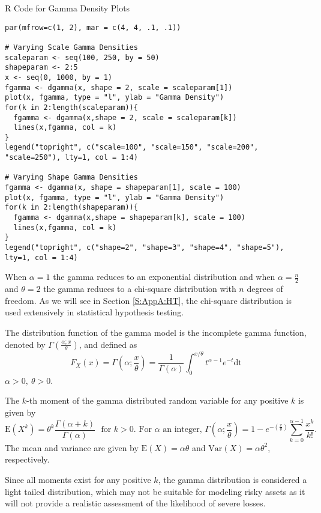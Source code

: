 \documentclass[]{book}
\theoremstyle{definition}
\theoremstyle{definition}
\theoremstyle{definition}
\theoremstyle{remark}
\begin{document}
R Code for Gamma Density Plots

\hypertarget{display.gammascale.2}{}
\begin{verbatim}
par(mfrow=c(1, 2), mar = c(4, 4, .1, .1))

# Varying Scale Gamma Densities
scaleparam <- seq(100, 250, by = 50)
shapeparam <- 2:5
x <- seq(0, 1000, by = 1)
fgamma <- dgamma(x, shape = 2, scale = scaleparam[1])
plot(x, fgamma, type = "l", ylab = "Gamma Density")
for(k in 2:length(scaleparam)){
  fgamma <- dgamma(x,shape = 2, scale = scaleparam[k])
  lines(x,fgamma, col = k)
}
legend("topright", c("scale=100", "scale=150", "scale=200", "scale=250"), lty=1, col = 1:4)

# Varying Shape Gamma Densities
fgamma <- dgamma(x, shape = shapeparam[1], scale = 100)
plot(x, fgamma, type = "l", ylab = "Gamma Density")
for(k in 2:length(shapeparam)){
  fgamma <- dgamma(x,shape = shapeparam[k], scale = 100)
  lines(x,fgamma, col = k)
}
legend("topright", c("shape=2", "shape=3", "shape=4", "shape=5"), lty=1, col = 1:4)
\end{verbatim}

When \(\alpha = 1\) the gamma reduces to an exponential distribution and
when \(\alpha = \frac{n}{2}\) and \(\theta = 2\) the gamma reduces to a
chi-square distribution with \(n\) degrees of freedom. As we will see in
Section \ref{S:AppA:HT}, the chi-square distribution is used extensively
in statistical hypothesis testing.

The distribution function of the gamma model is the incomplete gamma
function, denoted by \(\Gamma\left( \frac{\alpha;x}{\theta} \right)\),
and defined as
\[F_{X}\left( x \right) = \Gamma\left( \alpha; \frac{x}{\theta} \right) = \frac{1}{\Gamma\left( \alpha \right)}\int_{0}^{x /\theta}t^{\alpha - 1}e^{- t}\text{dt}\]
\(\alpha > 0,\ \theta > 0\).

The \(k\)-th moment of the gamma distributed random variable for any
positive \(k\) is given by
\[\mathrm{E}\left( X^{k} \right) = \theta^{k} \frac{\Gamma\left( \alpha + k \right)}{\Gamma\left( \alpha \right)}  \ \ \ \text{for } k > 0 \text{. For } \alpha \text{ an integer, } \Gamma\left( \alpha; \frac{x}{\theta} \right) = 1 - e^{-(\frac{x}{\theta})}\sum_{k = 0}^{\alpha-1}\frac{x^k}{k!}.\]
The mean and variance are given by
\(\mathrm{E}\left( X \right) = \alpha\theta\) and
\(\mathrm{Var}\left( X \right) = \alpha\theta^{2}\), respectively.

Since all moments exist for any positive \(k\), the gamma distribution
is considered a light tailed distribution, which may not be suitable for
modeling risky assets as it will not provide a realistic assessment of
the likelihood of severe losses.
\end{document}
